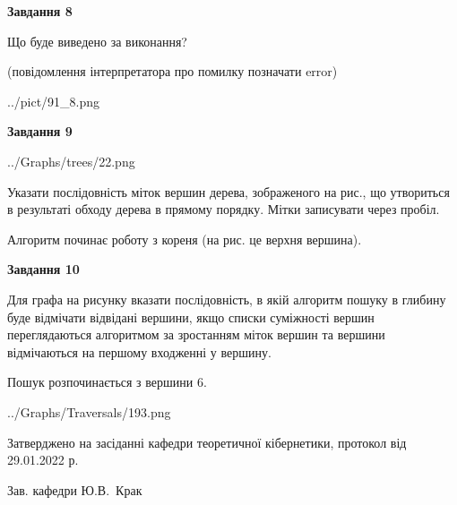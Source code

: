 \documentclass[12pt, ukrainian]{article}
\begin{document}
{\begin {large}
{\begin {center}\textbf{Завдання 8}\end {center}}\par
Що буде виведено за виконання?\par
 (повідомлення інтерпретатора про помилку позначати error)\par
\begin{center}
	{../pict/91_8.png}
\end{center}
\newpage

{\begin {center}\textbf{Завдання 9}\end {center}}\par

\begin{center}
	{../Graphs/trees/22.png}
\end{center}
Указати послідовність міток вершин дерева, зображеного на рис., що утвориться в результаті обходу дерева в прямому порядку. Мітки записувати через пробіл.\par Алгоритм починає роботу з кореня (на рис. це верхня вершина).\par
\newpage

{\begin {center}\textbf{Завдання 10}\end {center}}\par
Для графа на рисунку вказати послідовність, в якій алгоритм пошуку в глибину буде відмічати відвідані вершини, якщо списки суміжності вершин переглядаються алгоритмом за зростанням міток вершин та вершини відмічаються на першому вход\-женні у вершину.\par
Пошук розпочинається з вершини 6.\par

\begin{center}
	{../Graphs/Traversals/193.png}
\end{center}\par
\newpage


\end {large}
}
{\smallskip \begin {small} Затверджено на засіданні кафедри теоретичної кібернетики, протокол  від   29.01.2022 р.\par\smallskip\smallskip
{\parbox {6.5 cm}{Зав. кафедри \dotfill Ю.В.~Крак}} \end{small}}
\end{document}
